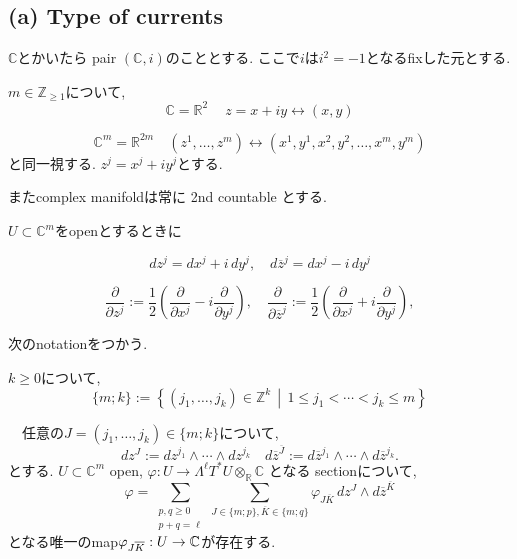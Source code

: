 \subsection{(a) Type of currents }

$\mathbb{C}$とかいたら pair  $(\mathbb{C}, i)$のこととする.
ここで$i$は$i^2=-1$となるfixした元とする. 

$m \in \mathbb{Z}_{\geq 1}$について, 
\[
\mathbb{C} = \mathbb{R}^2
\quad \ z=x+iy \leftrightarrow (x,y)
\]

\[
\mathbb{C}^m=\mathbb{R}^{2m}\quad 
(z^1,\dots,z^m) \leftrightarrow (x^1,y^1,x^2,y^2,\dots,x^m,y^m)
\]
と同一視する. 
$z^j=x^j+iy^j$とする. 

またcomplex manifoldは常に 2nd countable とする.

\begin{tcolorbox}[mybox]
\begin{defn}
\label{defn-M-4.1}
$ U \subset \mathbb{C}^m$をopenとするときに

\[
dz^j = dx^j + i\,dy^j,\quad d\overline{z}^j = dx^j - i\,dy^j
\]

\[
\frac{\partial}{\partial z^j} := \frac{1}{2}\left(\frac{\partial}{\partial x^j} - i\frac{\partial}{\partial y^j}\right),\quad
\frac{\partial}{\partial \overline{z}^j} := \frac{1}{2}\left(\frac{\partial}{\partial x^j} + i\frac{\partial}{\partial y^j}\right),
\]
\end{defn}
\end{tcolorbox}
次のnotationをつかう.

\begin{tcolorbox}[mybox]
\(k \geq 0\)について, 
\[
\{m; k \} := 
\left\{(j_1,\ldots,j_k)\in \mathbb{Z}^k \,\middle|\, 1 \leq j_1 < \cdots < j_k \leq m\right\}
\]

　任意の\(J=(j_1,\dots,j_k)\in \{m;k\}\)について, 
\[
dz^J := dz^{j_1}\wedge \cdots \wedge dz^{j_k}
\quad
d\overline{z}^{\overline{J}}:= d\overline{z}^{j_1}\wedge \cdots \wedge d\overline{z}^{j_k}.
\]
とする.  \(U\subset \mathbb{C}^m\) open, 
\(
 \varphi : U \to \Lambda^{\ell}T^{*}U\otimes_{\mathbb{R}} \mathbb{C}
 \)
となる
sectionについて, 
\[
\varphi = 
\sum_{\substack{p,q\geq 0\\ p+q=\ell}}
\sum_{J\in \{m;p\} , \overline{K}\in\{m;q\}}
\varphi_{J\overline{K}}\, dz^J\wedge d\overline{z}^{\overline{K}}
\]
となる唯一のmap\(\varphi_{J\overline{K}} : U \to \mathbb{C}\)が存在する. 
\end{tcolorbox}

